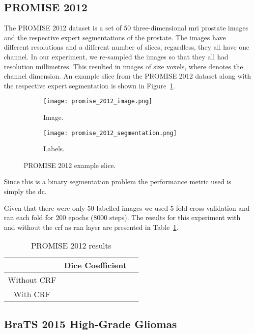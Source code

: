 \documentclass{article}
\begin{document}
\subsection{PROMISE 2012}

The PROMISE 2012 dataset \cite{PROMISE_2012} is a set of 50 three-dimensional \gls{mri} prostate images and the respective expert segmentations of the prostate. 
The images have different resolutions and a different number of slices, regardless, they all have one channel.
In our experiment, we re-sampled the images so that they all had resolution  millimetres.
This resulted in images of size  voxels, where  denotes the channel dimension.
An example slice from the PROMISE 2012 dataset along with the respective expert segmentation is shown in Figure~\ref{fig:promise_2012}.

\begin{figure}[ht]
\centering
\begin{subfigure}{.25\textwidth}
  \centering
  \texttt{[image: promise\_2012\_image.png]}
  \caption{Image.}
\end{subfigure}\begin{subfigure}{.25\textwidth}
  \centering
  \texttt{[image: promise\_2012\_segmentation.png]}
  \caption{Labels.}
\end{subfigure}
\caption{PROMISE 2012 example slice.}
\label{fig:promise_2012}
\end{figure}

Since this is a binary segmentation problem the performance metric used is simply the \gls{dc}.

Given that there were only 50 labelled images we used 5-fold cross-validation and ran each fold for 200 epochs (8000 steps). The results for this experiment with and without the \gls{crf} as \gls{rnn} layer are presented in Table~\ref{tab:promise_2012}.

\begin{table}[!ht]
\centering
\caption{PROMISE 2012 results}
\label{tab:promise_2012}
\begin{tabular}{@{}ccc@{}}
\toprule
            & Dice Coefficient   \\ \midrule
Without CRF &   \\
With CRF    &   \\ \bottomrule
\end{tabular}
\end{table}


\subsection{BraTS 2015 High-Grade Gliomas}
\end{document}
